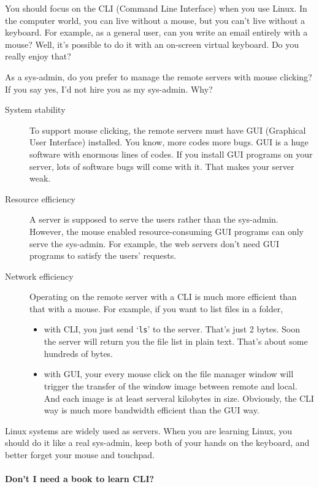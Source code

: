 \documentclass{article}
\begin{document}
You should focus on the CLI (Command Line Interface) when you use Linux.  In the computer
world, you can live without a mouse, but you can't live without a keyboard. For example,
as a general user, can you write an email entirely with a mouse?  Well, it's possible to
do it with an on-screen virtual keyboard. Do you really enjoy that?

As a sys-admin, do you prefer to manage the remote servers with mouse clicking? If you say
yes, I'd not hire you as my sys-admin. Why?

\begin{description}
\item[System stability] To support mouse clicking, the remote servers must have GUI
  (Graphical User Interface) installed. You know, more codes more bugs. GUI is a huge
  software with enormous lines of codes. If you install GUI programs on your server, lots
  of software bugs will come with it. That makes your server weak.
  
\item[Resource efficiency] A server is supposed to serve the users rather than the
  sys-admin. However, the mouse enabled resource-consuming GUI programs can only serve the
  sys-admin. For example, the web servers don't need GUI programs to satisfy the users'
  requests. 
  
\item[Network efficiency] Operating on the remote server with a CLI is much more efficient
  than that with a mouse. For example, if you want to list files in a folder,
  \begin{itemize}
  \item with CLI, you just send `\texttt{ls}' to the server. That's just 2 bytes. Soon the
    server will return you the file list in plain text. That's about some hundreds of bytes.
  \item with GUI, your every mouse click on the file manager window will trigger the
    transfer of the window image between remote and local. And each image is at least
    serveral kilobytes in size. Obviously, the CLI way is much more bandwidth efficient
    than the GUI way.
  \end{itemize}
\end{description}

Linux systems are widely used as servers. When you are learning Linux, you should do it
like a real sys-admin, keep both of your hands on the keyboard, and better forget your
mouse and touchpad.

\paragraph{Don't I need a book to learn CLI?}
\end{document}
